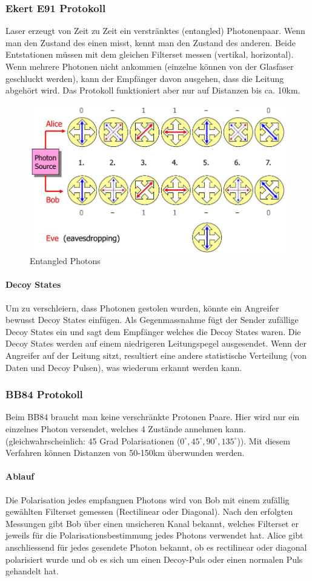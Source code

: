 \subsubsection{Ekert E91 Protokoll}
Laser erzeugt von Zeit zu Zeit ein verstränktes (entangled) Photonenpaar. Wenn man den Zustand des einen misst, kennt man den Zustand des anderen. Beide Entstationen müssen mit dem gleichen Filterset messen (vertikal, horizontal). Wenn mehrere Photonen nicht ankommen (einzelne können von der Glasfaser geschluckt werden), kann der Empfänger davon ausgehen, dass die Leitung abgehört wird. Das Protokoll funktioniert aber nur auf Distanzen bis ca. 10km.
\begin{figure}[h]
\centering
\includegraphics[width=0.5\linewidth]{images/entangled_photons}
\caption{Entangled Photons}
\label{fig:entangledphotons}
\end{figure}

\paragraph{Decoy States}
Um zu verschleiern, dass Photonen gestolen wurden, könnte ein Angreifer bewusst Decoy States einfügen. Als Gegenmassnahme fügt der Sender zufällige Decoy States ein und sagt dem Empfänger welches die Decoy States waren. Die Decoy States werden auf einem niedrigeren Leitungspegel ausgesendet. Wenn der Angreifer auf der Leitung sitzt, resultiert eine andere statistische Verteilung (von Daten und Decoy Pulsen), was wiederum erkannt werden kann.

\clearpage

\subsubsection{BB84 Protokoll}
Beim BB84 braucht man keine verschränkte Protonen Paare. Hier wird nur ein einzelnes Photon versendet, welches 4 Zustände annehmen kann. (gleichwahrscheinlich: 45 Grad Polarisationen ($0^{\circ},45^{\circ},90^{\circ},135^{\circ}$)). Mit diesem Verfahren können Distanzen von 50-150km überwunden werden.

\paragraph{Ablauf}
Die Polarisation jedes empfangnen Photons wird von Bob mit einem zufällig gewählten Filterset gemessen (Rectilinear oder Diagonal). Nach den erfolgten Messungen gibt Bob über einen unsicheren 
Kanal bekannt, welches Filterset er jeweils für die Polarisationsbestimmung jedes Photons verwendet hat. Alice gibt anschliessend für jedes gesendete Photon bekannt, ob es rectilinear oder diagonal polarisiert wurde und ob es sich um einen Decoy-Puls oder einen normalen Puls gehandelt hat. 

